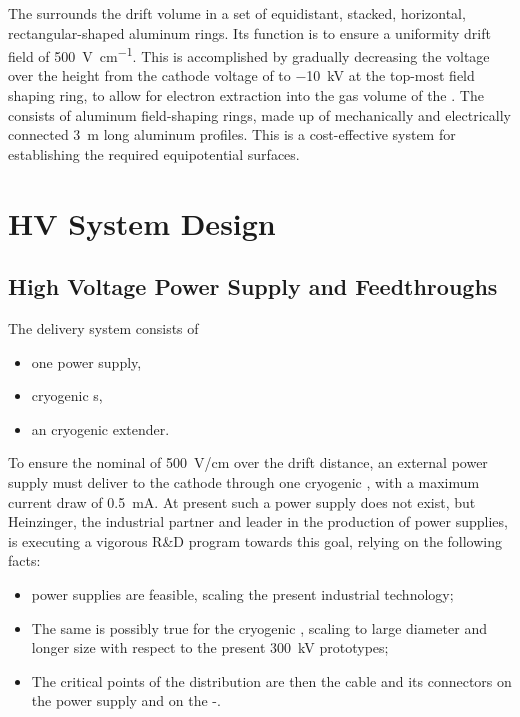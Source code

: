 The  surrounds the drift volume in a set of equidistant, stacked, horizontal, rectangular-shaped aluminum rings. Its function is to ensure a uniformity drift field of \SI{500}{\V\per\cm}. This is accomplished by gradually decreasing the voltage over the \tpcheight height from the cathode voltage of \dptargetdriftvoltneg to \SI{-10}{\kV} at the top-most field shaping ring, to allow for electron extraction into the gas volume of the . The  consists of aluminum field-shaping rings, made up of mechanically and electrically connected \SI{3}{m} long aluminum profiles.  
This is a cost-effective system for establishing the required equipotential surfaces. 

\section{HV System Design}
\label{sec:fddp-hv-design}

\subsection {High Voltage Power Supply and Feedthroughs}
The  delivery system consists of
\begin{itemize}
\item one power supply,
\item {} cryogenic \fdth{}s,
\item an  cryogenic extender.
\end{itemize}

To ensure the nominal \efield of \SI{500}{V/cm} over  the \dpmaxdrift drift distance, an external power supply must deliver \dptargetdriftvoltneg to  the cathode through one  cryogenic \fdth, with a maximum current draw of \SI{0.5}{\milli\ampere}.
At present such a power supply does not exist, but  Heinzinger, the industrial partner and leader in the production of  power supplies, is executing a vigorous R\&D program towards this goal, relying on the following facts:

\begin{itemize}
\item \dptargetdriftvoltpos power supplies are feasible, scaling the present industrial technology;
\item The same is possibly true for the  cryogenic \fdth, scaling to large diameter and longer size with respect to the present \SI{300}{\kV} prototypes;
\item The critical points of the  distribution are then the cable and its connectors on the power supply and on the -\fdth. 
\end{itemize}

